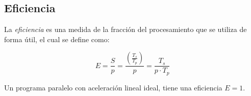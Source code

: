 \subsection{Eficiencia}
\label{section:efic}

La \emph{eficiencia} es una medida de la fracción del procesamiento que se utiliza de forma útil, el cual se define como:

\[E = \frac{S}{p} = \frac{\left(\frac{T_s}{T_p}\right)}{p} = \frac{T_s}{p \cdot T_p}\]

Un programa paralelo con aceleración lineal ideal, tiene una eficiencia $E = 1$. \cite{pacheco2011introduction}